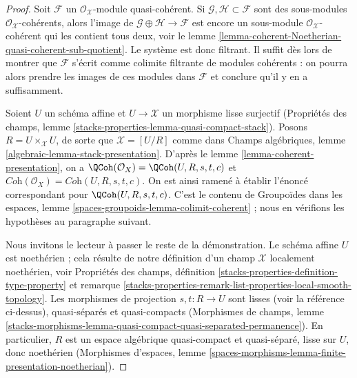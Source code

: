 \begin{proof}
Soit $\mathcal{F}$ un $\mathcal{O}_\mathcal{X}$-module quasi-cohérent.
Si $\mathcal{G}, \mathcal{H} \subset \mathcal{F}$ sont des sous-modules
$\mathcal{O}_\mathcal{X}$-cohérents, alors l'image de
$\mathcal{G} \oplus \mathcal{H} \to \mathcal{F}$ est encore un
sous-module $\mathcal{O}_\mathcal{X}$-cohérent qui les contient tous deux,
voir le lemme \ref{lemma-coherent-Noetherian-quasi-coherent-sub-quotient}.
Le système est donc filtrant.
Il suffit dès lors de montrer que $\mathcal{F}$ s'écrit comme
colimite filtrante de modules cohérents : on pourra alors prendre les
images de ces modules dans $\mathcal{F}$ et conclure qu'il y en a
suffisamment.

\medskip\noindent
Soient $U$ un schéma affine et $U \to \mathcal{X}$
un morphisme lisse surjectif (Propriétés des champs, lemme
\ref{stacks-properties-lemma-quasi-compact-stack}).
Posons $R = U \times_\mathcal{X} U$, de sorte que $\mathcal{X} = [U/R]$
comme dans Champs algébriques, lemme \ref{algebraic-lemma-stack-presentation}.
D'après le lemme \ref{lemma-coherent-presentation}, on a
$\QCoh(\mathcal{O}_X) = \QCoh(U, R, s, t, c)$ et
$\textit{Coh}(\mathcal{O}_X) = \textit{Coh}(U, R, s, t, c)$.
On est ainsi ramené à établir l'énoncé correspondant pour
$\QCoh(U, R, s, t, c)$. C'est le contenu de
Groupoïdes dans les espaces, lemme \ref{spaces-groupoids-lemma-colimit-coherent} ;
nous en vérifions les hypothèses au paragraphe suivant.

\medskip\noindent
Nous invitons le lecteur à passer le reste de la démonstration.
Le schéma affine $U$ est noethérien ; cela résulte de notre définition
d'un champ $\mathcal{X}$ localement noethérien, voir
Propriétés des champs, définition
\ref{stacks-properties-definition-type-property} et
remarque \ref{stacks-properties-remark-list-properties-local-smooth-topology}.
Les morphismes de projection $s, t : R \to U$ sont lisses (voir la référence
ci-dessus),
quasi-séparés et quasi-compacts (Morphismes de champs, lemme
\ref{stacks-morphisms-lemma-quasi-compact-quasi-separated-permanence}).
En particulier, $R$ est un espace algébrique quasi-compact et quasi-séparé,
lisse sur $U$, donc noethérien
(Morphismes d'espaces, lemme
\ref{spaces-morphisms-lemma-finite-presentation-noetherian}).
\end{proof}














